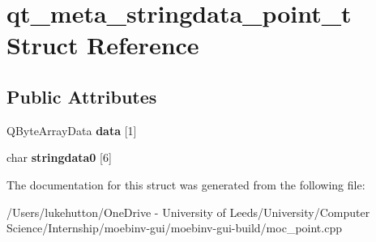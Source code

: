 \hypertarget{structqt__meta__stringdata__point__t}{}\section{qt\+\_\+meta\+\_\+stringdata\+\_\+point\+\_\+t Struct Reference}
\label{structqt__meta__stringdata__point__t}
\subsection*{Public Attributes}
\begin{DoxyCompactItemize}
\item 
\mbox{\label{structqt__meta__stringdata__point__t_a0967a3a4d1a2a917560b0e4a21b882a3}} 
Q\+Byte\+Array\+Data {\bfseries data} \mbox{[}1\mbox{]}
\item 
\mbox{\label{structqt__meta__stringdata__point__t_a42f42e4322b83cf3913e857c6fefb423}} 
char {\bfseries stringdata0} \mbox{[}6\mbox{]}
\end{DoxyCompactItemize}


The documentation for this struct was generated from the following file\+:\begin{DoxyCompactItemize}
\item 
/\+Users/lukehutton/\+One\+Drive -\/ University of Leeds/\+University/\+Computer Science/\+Internship/moebinv-\/gui/moebinv-\/gui-\/build/moc\+\_\+point.\+cpp\end{DoxyCompactItemize}
